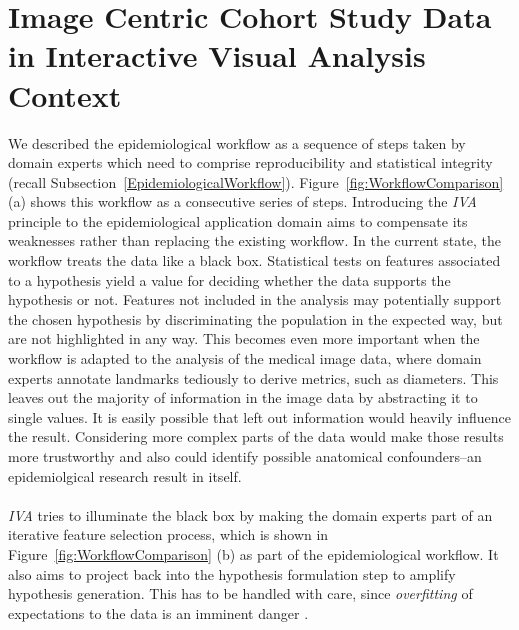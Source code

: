 \documentclass[journal]{style/vgtc} 			          %
\begin{document}
\section{Image Centric Cohort Study Data in Interactive Visual Analysis Context} \label{Image Centric Cohort Study Data in Interactive Visual Analysis Context}
We described the epidemiological workflow as a sequence of steps taken by domain experts which need to comprise reproducibility and statistical integrity (recall Subsection~\ref{EpidemiologicalWorkflow}).
%
Figure~\ref{fig:WorkflowComparison} (a) shows this workflow as a consecutive series of steps.
%
Introducing the \emph{IVA} principle to the epidemiological application domain aims to compensate its weaknesses rather than replacing the existing workflow.
%
In the current state, the workflow treats the data like a black box.
%
Statistical tests on features associated to a hypothesis yield a value for deciding whether the data supports the hypothesis or not.
%
Features not included in the analysis may potentially support the chosen hypothesis by discriminating the population in the expected way, but are not highlighted in any way.
%
This becomes even more important when the workflow is adapted to the analysis of the medical image data, where
domain experts annotate landmarks tediously to derive metrics, such as diameters.
%
This leaves out the majority of information in the image data by abstracting it to single values.
%
It is easily possible that left out information would heavily influence the result.
%
Considering more complex parts of the data would make those results more trustworthy and also could identify possible anatomical confounders--an epidemiolgical research result in itself.
\\\\
\emph{IVA} tries to illuminate the black box by making the domain experts part of an iterative feature selection process, which is shown in Figure~\ref{fig:WorkflowComparison} (b) as part of the epidemiological workflow.
%
It also aims to project back into the hypothesis formulation step to amplify hypothesis generation.
%
This has to be handled with care, since \emph{overfitting} of expectations to the data is an imminent danger \cite{Turkay2013}.
\end{document}
